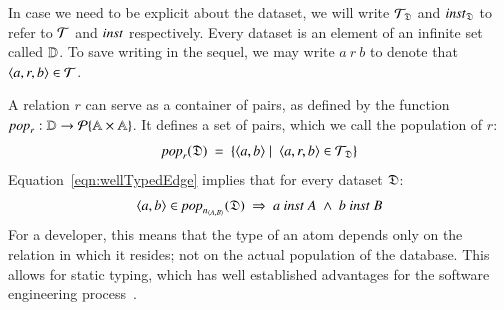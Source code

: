 \documentclass{elsarticle}
\begin{document}
   In case we need to be explicit about the dataset,
   we will write $\mathcal{T}_{\mathfrak{D}}$ and $\text{\it inst\/}_{\mathfrak{D}}$ to refer to $\mathcal{T}$ and $\text{\it inst\/}$ respectively.
   Every dataset is an element of an infinite set called $\mathbb{D}$.
   To save writing in the sequel, we may write $a\ r\ b$ to denote that $\langle{a},{r},{b}\rangle\in\mathcal{T}$.

   A relation $r$ can serve as a container of pairs,
   as defined by the function $\text{\it pop\/}_r:\mathbb{D}\rightarrow\cal{P}\{\mathbb{A}\times\mathbb{A}\}$.
   It defines a set of pairs, which we call the population of $r$:
\begin{equation}
   \pop{r}{\dataset}\ =\ \{ \pair{a}{b}\mid\ \triple{a}{r}{b}\in\triples_{\dataset}\}
\label{eqn:pop}
\end{equation}
   Equation~\ref{eqn:wellTypedEdge} implies that for every dataset $\mathfrak{D}$:
\[\pair{a}{b}\in\pop{\declare{n}{A}{B}}{\dataset}\ \Rightarrow\ a\ \inst\ A\ \wedge\ b\ \inst\ B\]
   For a developer, this means that the type of an atom depends only on the relation in which it resides; not on the actual population of the database.
   This allows for static typing, which has well established advantages for the software engineering process~\cite{HanenbergKRTS14,Petersen2014}.
\end{document}
